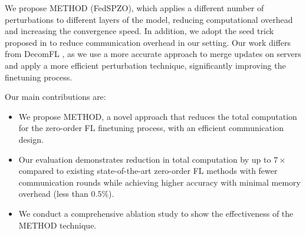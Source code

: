 We propose \acl{METHOD} (FedSPZO), which applies a different number of perturbations to different layers of the model, reducing computational overhead and increasing the convergence speed.
In addition, we adopt the seed trick proposed in \cite{malladi2023fine} to reduce communication overhead in our setting. Our work differs from DecomFL \cite{decomfl_cite}, as we use a more accurate approach to merge updates on servers and apply a more efficient perturbation technique, significantly improving the finetuning process.   


%


Our main contributions are:
\begin{itemize}
    \item We propose \ac{METHOD}, a novel approach that reduces the total computation for the zero-order \ac{FL} finetuning process, with an efficient communication design.
    \item Our evaluation demonstrates reduction in total computation by up to $7\times$ compared to existing state-of-the-art zero-order FL methods with fewer communication rounds while achieving higher accuracy with minimal memory overhead (less than $0.5\%$).
    \item We conduct a comprehensive ablation study to show the effectiveness of the \ac{METHOD} technique. 
\end{itemize}


